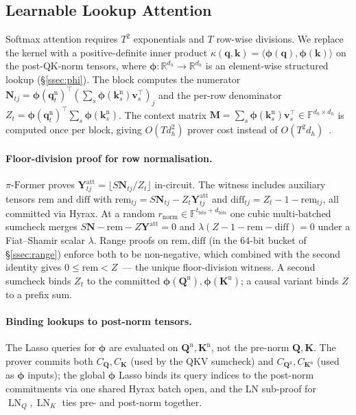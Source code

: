 \documentclass[letterpaper,twocolumn,10pt]{article}
\theoremstyle{remark}
\theoremstyle{definition}
\newcommand{\sys}{\ensuremath{\pi\text{-Former}}}
\newcommand{\FF}{\mathbb{F}}
\newcommand{\RR}{\mathbb{R}}
\newcommand{\bphi}{\boldsymbol{\phi}}
\newcommand{\bq}{\mathbf{q}}
\newcommand{\bk}{\mathbf{k}}
\newcommand{\bv}{\mathbf{v}}
\newcommand{\bM}{\mathbf{M}}
\newcommand{\bN}{\mathbf{N}}
\newcommand{\bY}{\mathbf{Y}}
\newcommand{\bQ}{\mathbf{Q}}
\newcommand{\bK}{\mathbf{K}}
\DeclareMathOperator{\LN}{LN}
\begin{document}
\subsection{Learnable Lookup Attention}
\label{ssec:LLA}

Softmax attention requires $T^2$ exponentials and $T$ row-wise
divisions. We replace the kernel with a positive-definite inner
product $\kappa(\bq,\bk)\!=\!\langle\bphi(\bq),\bphi(\bk)\rangle$ on
the post-QK-norm tensors, where $\bphi\!:\!\RR^{d_h}\!\to\!\RR^{d_h}$
is an element-wise structured lookup (\S\ref{ssec:phi}). The block
computes the numerator
$\bN_{tj}\!=\!\bphi(\bq_t^{\mathrm{n}})^\top\!(\sum_s\bphi(\bk_s^{\mathrm{n}})\bv_s^\top)_j$
and the per-row denominator
$Z_t\!=\!\bphi(\bq_t^{\mathrm{n}})^\top\!\sum_s\bphi(\bk_s^{\mathrm{n}})$.
The context matrix
$\bM\!=\!\sum_s\bphi(\bk_s^{\mathrm{n}})\bv_s^\top\!\in\!\FF^{d_h\times d_h}$
is computed once per block, giving $O(T d_h^2)$ prover cost instead of
$O(T^2 d_h)$~\cite{katharopoulos2020transformers}.

\paragraph{Floor-division proof for row normalisation.}
\sys{} proves $\bY^{\mathrm{att}}_{tj}\!=\!\lfloor S\bN_{tj}/Z_t\rfloor$
in-circuit. The witness includes auxiliary tensors $\mathrm{rem}$ and
$\mathrm{diff}$ with $\mathrm{rem}_{tj}\!=\!S\bN_{tj}\!-\!Z_t\bY^{\mathrm{att}}_{tj}$
and $\mathrm{diff}_{tj}\!=\!Z_t\!-\!1\!-\!\mathrm{rem}_{tj}$, all
committed via Hyrax. At a random
$r_{\mathrm{norm}}\!\in\!\FF^{t_{\mathrm{bits}}+d_{\mathrm{bits}}}$ one
cubic multi-batched sumcheck merges
$S\bN-\mathrm{rem}-Z\bY^{\mathrm{att}}=0$ and
$\lambda(Z-1-\mathrm{rem}-\mathrm{diff})=0$ under a Fiat--Shamir
scalar $\lambda$. Range proofs on $\mathrm{rem},\mathrm{diff}$ (in the
64-bit bucket of \S\ref{ssec:range}) enforce both to be non-negative,
which combined with the second identity gives
$0\!\le\!\mathrm{rem}\!<\!Z$~--- the unique floor-division witness. A
second sumcheck binds $Z_t$ to the committed
$\bphi(\bQ^{\mathrm n}),\bphi(\bK^{\mathrm n})$; a causal variant
binds $Z$ to a prefix sum.

\paragraph{Binding lookups to post-norm tensors.}
The Lasso queries for $\bphi$ are evaluated on $\bQ^{\mathrm n},\bK^{\mathrm n}$,
not the pre-norm $\bQ,\bK$. The prover commits both
$C_{\bQ},C_{\bK}$ (used by the QKV sumcheck) and
$C_{\bQ^{\mathrm n}},C_{\bK^{\mathrm n}}$ (used as $\bphi$ inputs); the
global $\bphi$ Lasso binds its query indices to the post-norm commitments
via one shared Hyrax batch open, and the LN sub-proof for $\LN_Q,\LN_K$
ties pre- and post-norm together.
\end{document}
